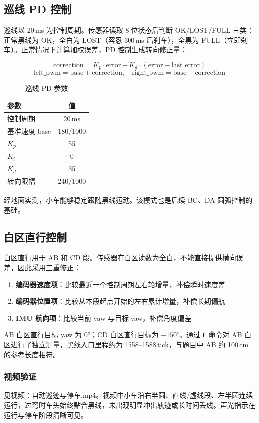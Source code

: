 \documentclass[12pt,a4paper]{ctexart}
\begin{document}
\subsection{巡线 PD 控制}
巡线以 20\,ms 为控制周期。传感器读取 8 位状态后判断 OK/LOST/FULL 三类：正常黑线为 OK，全白为 LOST（容忍 300\,ms 后刹车），全黑为 FULL（立即刹车）。正常情况下计算加权误差，PD 控制生成转向修正量：

\[
\text{correction} = K_p \cdot \text{error} + K_d \cdot (\text{error} - \text{last\_error})
\]
\[
\text{left\_pwm} = \text{base} + \text{correction},\quad
\text{right\_pwm} = \text{base} - \text{correction}
\]

\begin{table}[H]
\centering
\caption{巡线 PD 参数}
\begin{tabular}{@{}lc@{}}
\toprule
\textbf{参数} & \textbf{值} \\
\midrule
控制周期 & 20\,ms \\
基准速度 base & 180/1000 \\
$K_p$ & 55 \\
$K_i$ & 0 \\
$K_d$ & 35 \\
转向限幅 & 240/1000 \\
\bottomrule
\end{tabular}
\end{table}

经地面实测，小车能够稳定跟随黑线运动。该模式也是后续 BC、DA 圆弧控制的基础。

\subsection{白区直行控制}
白区直行用于 AB 和 CD 段。传感器在白区读数为全白，不能直接提供横向误差，因此采用三重修正：
\begin{enumerate}[nosep]
    \item \textbf{编码器速度项}：比较最近一个控制周期左右轮增量，补偿瞬时速度差
    \item \textbf{编码器位置项}：比较从本段起点开始的左右累计增量，补偿长期偏航
    \item \textbf{IMU 航向项}：比较当前 yaw 与目标 yaw，补偿角度偏差
\end{enumerate}

AB 白区直行目标 yaw 为 0°；CD 白区直行目标为 $-150^\circ$。通过 \texttt{F} 命令对 AB 白区进行了独立测量，黑线入口里程约为 1558--1588\,tick，与题目中 AB 约 100\,cm 的参考长度相符。

\subsubsection*{视频验证}
见视频：自动巡迹与停车.mp4。视频中小车沿右半圆、直线/虚线段、左半圆连续运行，过弯时车头始终贴合黑线，未出现明显冲出轨迹或长时间丢线。声光指示在运行与停车阶段清晰可见。
\end{document}
